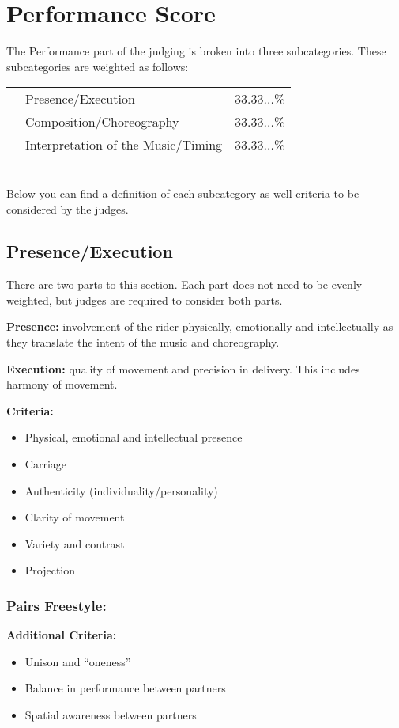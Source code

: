 \section{Performance Score \label{sec:freestyle_performance-score}}
The Performance part of the judging is broken into three subcategories.
These subcategories are weighted as follows:

\begin{tabular}{l l l}
 & Presence/Execution & 33.33...\% \\
 & Composition/Choreography & 33.33...\% \\
 & Interpretation of the Music/Timing & 33.33...\% \\
\end{tabular}\\

Below you can find a definition of each subcategory as well criteria to be considered by the judges.

\subsection{Presence/Execution}
There are two parts to this section.
Each part does not need to be evenly weighted, but judges are required to consider both parts.

\textbf{Presence:} involvement of the rider physically, emotionally and intellectually as they translate the intent of the music and choreography.

\textbf{Execution:} quality of movement and precision in delivery.
This includes harmony of movement.

\textbf{Criteria:}
\begin{itemize}
\item Physical, emotional and intellectual presence
\item Carriage
\item Authenticity (individuality/personality)
\item Clarity of movement
\item Variety and contrast
\item Projection
\end{itemize}

\subsubsection{Pairs Freestyle:}
\textbf{Additional Criteria:}
\begin{itemize}
\item Unison and ``oneness''
\item Balance in performance between partners
\item Spatial awareness between partners
\end{itemize}

